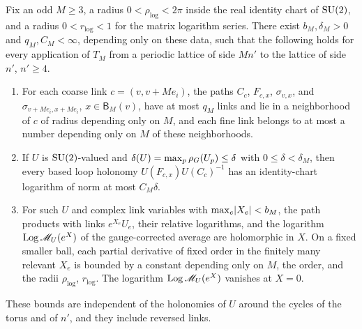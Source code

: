\begin{lemma}\label{ch05:lem:word-bounds}
Fix an odd $M\ge3$, a radius $0<\rho_{\log}<2\pi$ inside the real identity chart of $\mathrm{SU}(2)$, and a radius $0<r_{\log}<1$ for the matrix logarithm series. There exist $b_M,\delta_M>0$ and $q_M,C_M<\infty$, depending only on these data, such that the following holds for every application of $T_M$ from a periodic lattice of side $Mn'$ to the lattice of side $n'$, $n'\ge4$.
\begin{enumerate}
\item For each coarse link $c=(v,v+Me_i)$, the paths $C_c$, $F_{c,x}$, $\sigma_{v,x}$, and $\sigma_{v+Me_i,x+Me_i}$, $x\in\mathsf B_M(v)$, have at most $q_M$ links and lie in a neighborhood of $c$ of radius depending only on $M$, and each fine link belongs to at most a number depending only on $M$ of these neighborhoods.
\item If $U$ is $\mathrm{SU}(2)$-valued and $\delta(U)=\max_p\rho_G(U_p)\le\delta$ with $0\le\delta<\delta_M$, then every based loop holonomy $U(F_{c,x})U(C_c)^{-1}$ has an identity-chart logarithm of norm at most $C_M\delta$.
\item For such $U$ and complex link variables with $\max_e\lvert X_e\rvert<b_M$, the path products with links $e^{X_e}U_e$, their relative logarithms, and the logarithm $\operatorname{Log}\mathscr M_U(e^X)$ of the gauge-corrected average are holomorphic in $X$. On a fixed smaller ball, each partial derivative of fixed order in the finitely many relevant $X_e$ is bounded by a constant depending only on $M$, the order, and the radii $\rho_{\log}$, $r_{\log}$. The logarithm $\operatorname{Log}\mathscr M_U(e^X)$ vanishes at $X=0$.
\end{enumerate}
These bounds are independent of the holonomies of $U$ around the cycles of the torus and of $n'$, and they include reversed links.
\end{lemma}

